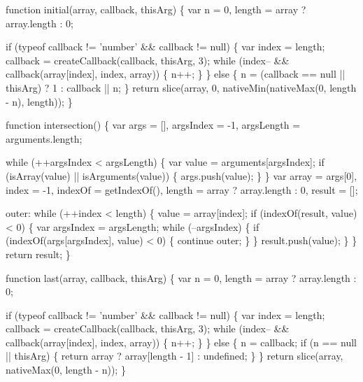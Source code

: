 \begin{DoxyCodeInclude}
{{  \textcolor{keyword}{function} initial(array, callback, thisArg) \{
    var n = 0,
        length = array ? array.length : 0;

    \textcolor{keywordflow}{if} (typeof callback != \textcolor{stringliteral}{'number'} && callback != null) \{
      var index = length;
      callback = createCallback(callback, thisArg, 3);
      \textcolor{keywordflow}{while} (index-- && callback(array[index], index, array)) \{
        n++;
      \}
    \} \textcolor{keywordflow}{else} \{
      n = (callback == null || thisArg) ? 1 : callback || n;
    \}
    \textcolor{keywordflow}{return} slice(array, 0, nativeMin(nativeMax(0, length - n), length));
  \}

  \textcolor{keyword}{function} intersection() \{
    var args = [],
        argsIndex = -1,
        argsLength = arguments.length;

    \textcolor{keywordflow}{while} (++argsIndex < argsLength) \{
      var value = arguments[argsIndex];
       \textcolor{keywordflow}{if} (isArray(value) || isArguments(value)) \{
         args.push(value);
       \}
    \}
    var array = args[0],
        index = -1,
        indexOf = getIndexOf(),
        length = array ? array.length : 0,
        result = [];

    outer:
    \textcolor{keywordflow}{while} (++index < length) \{
      value = array[index];
      \textcolor{keywordflow}{if} (indexOf(result, value) < 0) \{
        var argsIndex = argsLength;
        \textcolor{keywordflow}{while} (--argsIndex) \{
          \textcolor{keywordflow}{if} (indexOf(args[argsIndex], value) < 0) \{
            \textcolor{keywordflow}{continue} outer;
          \}
        \}
        result.push(value);
      \}
    \}
    \textcolor{keywordflow}{return} result;
  \}

  \textcolor{keyword}{function} last(array, callback, thisArg) \{
    var n = 0,
        length = array ? array.length : 0;

    \textcolor{keywordflow}{if} (typeof callback != \textcolor{stringliteral}{'number'} && callback != null) \{
      var index = length;
      callback = createCallback(callback, thisArg, 3);
      \textcolor{keywordflow}{while} (index-- && callback(array[index], index, array)) \{
        n++;
      \}
    \} \textcolor{keywordflow}{else} \{
      n = callback;
      \textcolor{keywordflow}{if} (n == null || thisArg) \{
        \textcolor{keywordflow}{return} array ? array[length - 1] : undefined;
      \}
    \}
    \textcolor{keywordflow}{return} slice(array, nativeMax(0, length - n));
  \}

}}
\end{DoxyCodeInclude}
